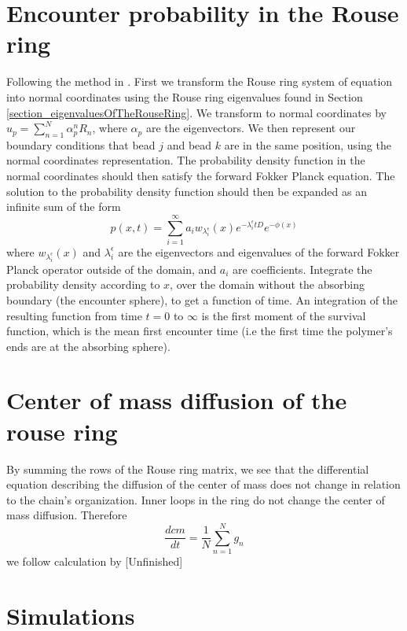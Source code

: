 \documentclass{paper}
\begin{document}
\section{Encounter probability in the Rouse ring}\label{section_encounterProbabilityInTheRouseRing}
Following the method in \cite{amitai2012computation}. First we transform the Rouse ring system of equation into normal coordinates using the Rouse ring eigenvalues found in Section \ref{section_eigenvaluesOfTheRouseRing}. We transform to normal coordinates by $u_p=\sum_{n=1}^N \alpha_p^nR_n$, where $\alpha_p$ are the eigenvectors. We then represent our boundary conditions that bead $j$ and bead $k$ are in the same position, using the normal coordinates representation. The probability density function in the normal coordinates should then satisfy the forward Fokker Planck equation. The solution to the probability density function should then be expanded as an infinite sum of the form 
\begin{equation*}
p(x,t)=\sum_{i=1}^\infty a_iw_{\lambda_i^\epsilon}(x)e^{-\lambda_i^\epsilon tD}e^{-\phi(x)}
\end{equation*}
where $w_{\lambda_i^\epsilon}(x)$ and $\lambda_i^\epsilon$ are the eigenvectors and eigenvalues of the forward Fokker Planck operator outside of the domain, and $a_i$ are coefficients. Integrate the probability density according to $x$, over the domain without the absorbing boundary (the encounter sphere), to get a function of time. An integration of the resulting function from time $t=0$ to $\infty$ is the first moment of the survival function, which is the mean first encounter time (i.e the first time the polymer's ends are at the absorbing sphere). 


\section{Center of mass diffusion of the rouse ring}\label{section_centerOfMassDiffusionOfTheRouseRing}
By summing the rows of the Rouse ring matrix, we see that the differential equation describing the diffusion of the center of mass does not change in relation to the chain's organization. Inner loops in the ring do not change the center of mass diffusion. Therefore 
\begin{equation*}
\frac{dcm}{dt} = \frac{1}{N}\sum_{n=1}^N g_n
\end{equation*}
we follow calculation by 
[Unfinished]

\section{Simulations}
\end{document}
